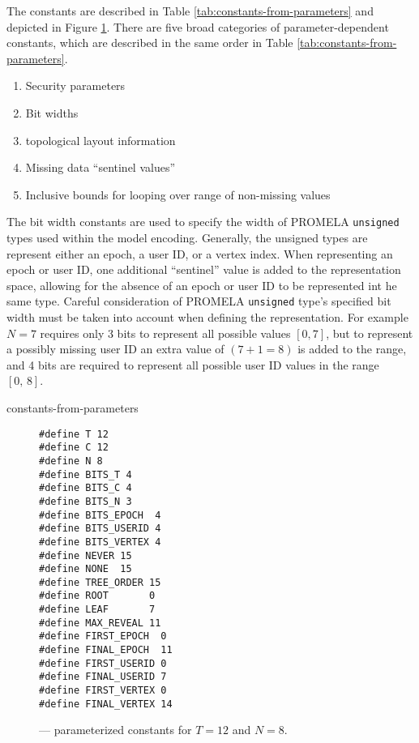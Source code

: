 The constants are described in Table \ref{tab:constants-from-parameters} and depicted in Figure \ref{fig:Encoded-Constants}.
There are five broad categories of parameter-dependent constants, which are described in the same order in Table \ref{tab:constants-from-parameters}.

\begin{enumerate}
\item Security parameters
\item Bit widths
\item {} topological layout information
\item Missing data ``sentinel values''
\item Inclusive bounds for looping over range of non-missing values
\end{enumerate}

The bit width constants are used to specify the width of PROMELA \texttt{unsigned} types used within the model encoding.
Generally, the unsigned types are represent either an epoch, a user ID, or a  vertex index.
When representing an epoch or user ID, one additional ``sentinel'' value is added to the representation space, allowing for the absence of an epoch or user ID to be represented int he same type.
Careful consideration of PROMELA \texttt{unsigned} type's specified bit width must be taken into account when defining the representation.
For example \(N=7\) requires only 3 bits to represent all possible values \([0,7]\), but to represent a possibly missing user ID an extra value of \((7 + 1 = 8)\) is added to the range, and 4 bits are required to represent all possible user ID values in the range \([0,\, 8]\).

\begin{table}[h!]
\centering
\caption{%
\label{tab:constants-from-parameters}%
Derivation constants in  model from parameters\(T\) and \(N\).
}%
{constants-from-parameters}
\end{table}
    
\begin{figure}[h!]
  \centering
  \caption{\label{fig:Encoded-Constants}\CGKAmod{}{}{} --- parameterized constants for \(T=12\) and \(N=8\).}
\begin{verbatim}
#define T 12
#define C 12
#define N 8
#define BITS_T 4
#define BITS_C 4
#define BITS_N 3
#define BITS_EPOCH  4
#define BITS_USERID 4
#define BITS_VERTEX 4
#define NEVER 15
#define NONE  15
#define TREE_ORDER 15
#define ROOT       0
#define LEAF       7
#define MAX_REVEAL 11
#define FIRST_EPOCH  0
#define FINAL_EPOCH  11
#define FIRST_USERID 0
#define FINAL_USERID 7
#define FIRST_VERTEX 0
#define FINAL_VERTEX 14
\end{verbatim}
\end{figure}

